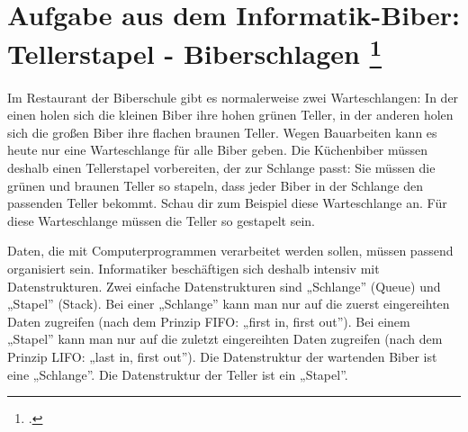 \documentclass{bschlangaul-aufgabe}
\begin{document}

\section{Aufgabe aus dem Informatik-Biber: Tellerstapel - Biberschlagen
\footcite[Seite 35]{net:pdf:informatik-biber-2010}}

Im Restaurant der Biberschule gibt es normalerweise zwei Warteschlangen:
In der einen holen sich die kleinen Biber ihre hohen grünen Teller, in
der anderen holen sich die großen Biber ihre flachen braunen Teller.
Wegen Bauarbeiten kann es heute nur eine Warteschlange für alle Biber
geben. Die Küchenbiber müssen deshalb einen Tellerstapel vorbereiten,
der zur Schlange passt: Sie müssen die grünen und braunen Teller so
stapeln, dass jeder Biber in der Schlange den passenden Teller bekommt.
Schau dir zum Beispiel diese Warteschlange an. Für diese Warteschlange
müssen die Teller so gestapelt sein.

Daten, die mit Computerprogrammen verarbeitet werden sollen, müssen
passend organisiert sein. Informatiker beschäftigen sich deshalb
intensiv mit Datenstrukturen. Zwei einfache Datenstrukturen sind
„Schlange” (Queue) und „Stapel” (Stack). Bei einer „Schlange” kann man
nur auf die zuerst eingereihten Daten zugreifen (nach dem Prinzip FIFO:
„first in, first out”). Bei einem „Stapel” kann man nur auf die zuletzt
eingereihten Daten zugreifen (nach dem Prinzip LIFO: „last in, first
out”). Die Datenstruktur der wartenden Biber ist eine „Schlange”. Die
Datenstruktur der Teller ist ein „Stapel”.
\end{document}
